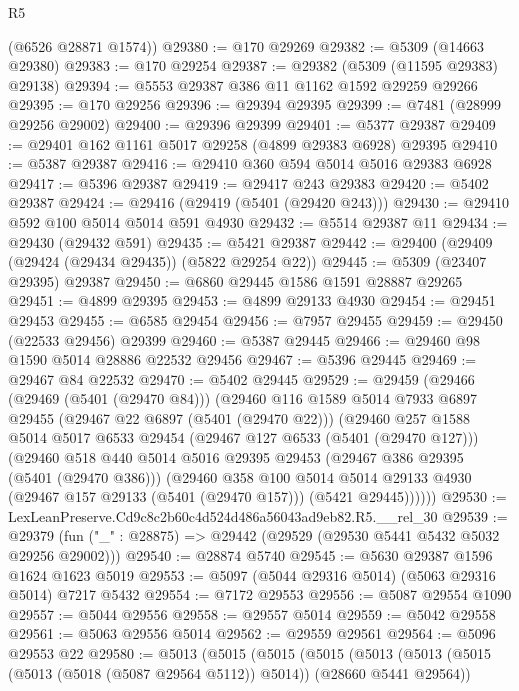 \begin{lexlean}{R5}
\begin{coremodule}
      (@6526 @28871 @1574))
@29380 := @170 @29269
@29382 := @5309 (@14663 @29380)
@29383 := @170 @29254
@29387 := @29382 (@5309 (@11595 @29383) @29138)
@29394 := @5553 @29387 @386 @11 @1162 @1592 @29259 @29266
@29395 := @170 @29256
@29396 := @29394 @29395
@29399 := @7481 (@28999 @29256 @29002)
@29400 := @29396 @29399
@29401 := @5377 @29387
@29409 := @29401 @162 @1161 @5017 @29258 (@4899 @29383 @6928) @29395
@29410 := @5387 @29387
@29416 := @29410 @360 @594 @5014 @5016 @29383 @6928
@29417 := @5396 @29387
@29419 := @29417 @243 @29383
@29420 := @5402 @29387
@29424 := @29416 (@29419 (@5401 (@29420 @243)))
@29430 := @29410 @592 @100 @5014 @5014 @591 @4930
@29432 := @5514 @29387 @11
@29434 := @29430 (@29432 @591)
@29435 := @5421 @29387
@29442 := @29400 (@29409 (@29424 (@29434 @29435)) (@5822 @29254 @22))
@29445 := @5309 (@23407 @29395) @29387
@29450 := @6860 @29445 @1586 @1591 @28887 @29265
@29451 := @4899 @29395
@29453 := @4899 @29133 @4930
@29454 := @29451 @29453
@29455 := @6585 @29454
@29456 := @7957 @29455
@29459 := @29450 (@22533 @29456) @29399
@29460 := @5387 @29445
@29466 := @29460 @98 @1590 @5014 @28886 @22532 @29456
@29467 := @5396 @29445
@29469 := @29467 @84 @22532
@29470 := @5402 @29445
@29529 := @29459
    (@29466
      (@29469 (@5401 (@29470 @84)))
      (@29460
        @116
        @1589
        @5014
        @7933
        @6897
        @29455
        (@29467 @22 @6897 (@5401 (@29470 @22)))
        (@29460
          @257
          @1588
          @5014
          @5017
          @6533
          @29454
          (@29467 @127 @6533 (@5401 (@29470 @127)))
          (@29460
            @518
            @440
            @5014
            @5016
            @29395
            @29453
            (@29467 @386 @29395 (@5401 (@29470 @386)))
            (@29460
              @358
              @100
              @5014
              @5014
              @29133
              @4930
              (@29467 @157 @29133 (@5401 (@29470 @157)))
              (@5421 @29445))))))
@29530 := LexLeanPreserve.Cd9c8c2b60c4d524d486a56043ad9eb82.R5.__rel_30
@29539 := @29379 (fun ("_" : @28875) => @29442 (@29529 (@29530 @5441 @5432 @5032 @29256 @29002)))
@29540 := @28874 @5740
@29545 := @5630 @29387 @1596 @1624 @1623 @5019
@29553 := @5097 (@5044 @29316 @5014) (@5063 @29316 @5014) @7217 @5432
@29554 := @7172 @29553
@29556 := @5087 @29554 @1090
@29557 := @5044 @29556
@29558 := @29557 @5014
@29559 := @5042 @29558
@29561 := @5063 @29556 @5014
@29562 := @29559 @29561
@29564 := @5096 @29553 @22
@29580 := @5013
    (@5015
      (@5015
        (@5015
          (@5013
            (@5013 (@5015 (@5013 (@5018 (@5087 @29564 @5112)) @5014)) (@28660 @5441 @29564))

\end{coremodule}
\end{lexlean}
